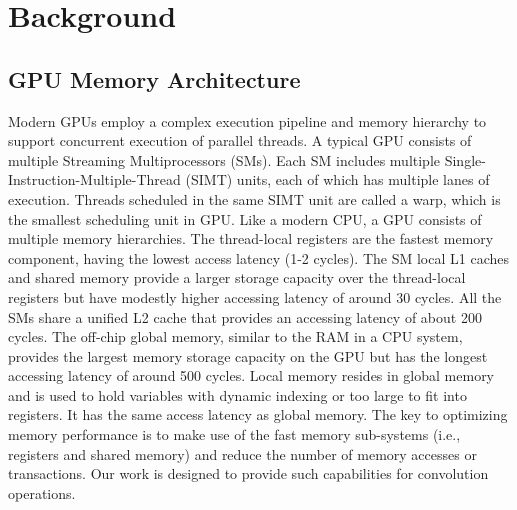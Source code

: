 
\section{Background}
\subsection{GPU Memory Architecture}
Modern GPUs employ a complex execution pipeline and memory hierarchy to support concurrent execution of parallel threads. A typical GPU
consists of multiple Streaming Multiprocessors (SMs). Each SM includes multiple Single-Instruction-Multiple-Thread (SIMT) units, each of
which has multiple lanes of execution. Threads scheduled in the same SIMT unit are called a warp, which is the smallest scheduling unit in
GPU. Like a modern CPU, a GPU consists of multiple memory hierarchies. The thread-local registers are the fastest memory component, having
the lowest access latency (1-2 cycles). The SM local L1 caches and shared memory provide a larger storage capacity over the thread-local
registers but have modestly higher accessing latency of around 30 cycles. All the SMs share a unified L2 cache that provides an accessing
latency of about 200 cycles. The off-chip global memory, similar to the RAM in a CPU system, provides the largest memory storage capacity
on the GPU but has the longest accessing latency of around 500 cycles. Local memory resides in global memory and is used to hold variables with dynamic indexing or too large to fit into registers. It has the same access latency as global memory. The key to optimizing memory performance is to make use of the fast
memory sub-systems (i.e., registers and shared memory) and reduce the number of memory accesses or transactions. Our work is designed to
provide such capabilities for convolution operations.

